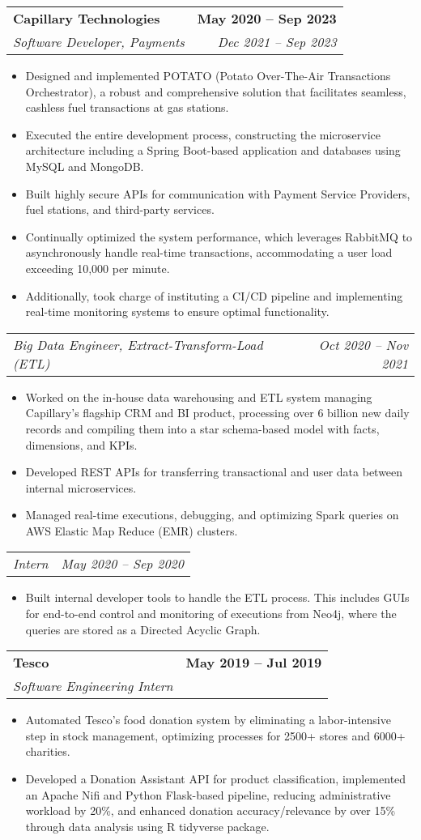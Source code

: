 \documentclass[letterpaper,11pt]{article}
\makeatletter
\newcommand{\resumeItem}[1]{
  \item\small{
    {#1 \vspace{-2pt}}
  }
}
\newcommand{\resumeSubheading}[4]{
  \vspace{-2pt}\item
    \begin{tabular*}{1.0\textwidth}[t]{l@{\extracolsep{\fill}}r}
      \textbf{#1} & \textbf{\small #2} \\
      \textit{\small#3} & \textit{\small #4} \\
    \end{tabular*}\vspace{-7pt}
}
\newcommand{\resumeSubSubheading}[2]{
    \item
    \begin{tabular*}{1.0\textwidth}{l@{\extracolsep{\fill}}r}
      \textit{\small#1} & \textit{\small #2} \\
    \end{tabular*}\vspace{-7pt}
}
\newcommand{\resumeItemListStart}{\begin{itemize}}
\newcommand{\resumeItemListEnd}{\end{itemize}\vspace{-5pt}}
\makeatother
\begin{document}
    \resumeSubheading
      {Capillary Technologies}{May 2020 -- Sep 2023}
      {Software Developer, Payments}{Dec 2021 -- Sep 2023}
      \resumeItemListStart
        \resumeItem{
        Designed and implemented POTATO (Potato Over-The-Air Transactions Orchestrator), a robust and comprehensive solution that facilitates seamless, cashless fuel transactions at gas stations.
        }
        \resumeItem{
        Executed the entire development process, constructing the microservice architecture including a Spring Boot-based application and databases using MySQL and MongoDB.
        }
        \resumeItem{
        Built highly secure APIs for communication with Payment Service Providers, fuel stations, and third-party services.
        }
        \resumeItem{
        Continually optimized the system performance, which leverages RabbitMQ to asynchronously handle real-time transactions, accommodating a user load exceeding 10,000 per minute.
        }
        \resumeItem{
        Additionally, took charge of instituting a CI/CD pipeline and implementing real-time monitoring systems to ensure optimal functionality.
        }
      \resumeItemListEnd
\pagebreak \vspace*{30pt}

    \resumeSubSubheading
      {Big Data Engineer, Extract-Transform-Load (ETL)}{Oct 2020 -- Nov 2021}
      \resumeItemListStart
        \resumeItem{Worked on the in-house data warehousing and ETL system managing Capillary’s flagship CRM and BI product, processing over 6 billion new daily records and compiling them into a star schema-based model with facts, dimensions, and KPIs.}
        \resumeItem{ Developed REST APIs for transferring transactional and user data between internal microservices.}
        \resumeItem{Managed real-time executions, debugging, and optimizing Spark queries on AWS Elastic Map Reduce (EMR) clusters.}
      \resumeItemListEnd

    \resumeSubSubheading
      {Intern}{May 2020 -- Sep 2020}
      \resumeItemListStart
        \resumeItem{Built internal developer tools to handle the ETL process. This includes GUIs for end-to-end control and monitoring of executions from Neo4j, where the queries are stored as a Directed Acyclic Graph.}
      \resumeItemListEnd


    \resumeSubheading
      {Tesco}{May 2019 -- Jul 2019}
      {Software Engineering Intern}{}
      \resumeItemListStart
        \resumeItem{Automated Tesco's food donation system by eliminating a labor-intensive step in stock management, optimizing processes for 2500+ stores and 6000+ charities.
        }
        \resumeItem{Developed a Donation Assistant API for product classification, implemented an Apache Nifi and Python Flask-based pipeline, reducing administrative workload by 20\%, and enhanced donation accuracy/relevance by over 15\% through data analysis using R tidyverse package.
        }
    \resumeItemListEnd
\end{document}
